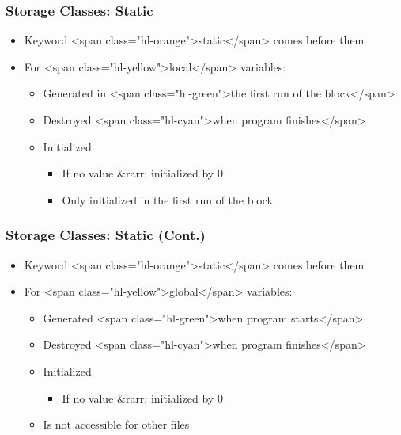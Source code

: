 \documentclass{../c-lecture}
\begin{document}
\begin{frame}
  \frametitle{Storage Classes: Static}
  \begin{itemize}
    \item Keyword <span class="hl-orange">static</span> comes before them
    \item For <span class="hl-yellow">local</span> variables:
    \begin{itemize}
      \item
        Generated in
        <span class="hl-green">the first run of the block</span>

      \item Destroyed <span class="hl-cyan">when program finishes</span>
      \item Initialized
      \begin{itemize}
        \item If no value &rarr; initialized by 0
        \item Only initialized in the first run of the block
      \end{itemize}
    \end{itemize}
  \end{itemize}
\end{frame}
\begin{frame}
  \frametitle{Storage Classes: Static (Cont.)}
  \begin{itemize}
    \item Keyword <span class="hl-orange">static</span> comes before them
    \item For <span class="hl-yellow">global</span> variables:
    \begin{itemize}
      \item Generated <span class="hl-green">when program starts</span>
      \item Destroyed <span class="hl-cyan">when program finishes</span>
      \item Initialized
      \begin{itemize}
        \item If no value &rarr; initialized by 0
      \end{itemize}
      \item Is not accessible for other files
    \end{itemize}
  \end{itemize}
\end{frame}
\end{document}
